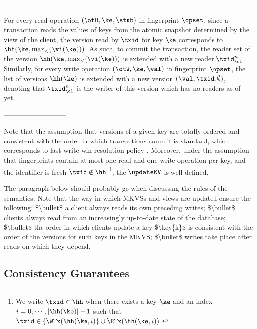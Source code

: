 ----------------------------

For every read operation $(\otR, \ke, \stub)$ in fingerprint $\opset$,
since a transaction reads the values of keys from 
the atomic snapshot determined by the view of the client, 
the version read by $\txid$ for key $\ke$ corresponds to $\hh(\ke, \max_{<}(\vi(\ke)))$.
As such, to commit the transaction, 
the reader set of the version $\hh(\ke, \max_{<}(\vi(\ke)))$ is extended with a new reader $\txid_\cl^n$.
Similarly, for every write operation $(\otW, \ke, \val)$ in fingerprint $\opset$, 
the list of versions $\hh(\ke)$ is extended with a new version $(\val, \txid, \emptyset)$, 
denoting that $\txid_\cl^n$ is the writer of this version which has no readers as of yet. 

---------------------------

Note that the assumption that 
versions of a given key are totally ordered and consistent with the order in which 
transactions commit is standard, 
which corresponds to last-write-win resolution policy \cite{adya,framework-concur,seebelieve}. 
Moreover, under the assumption that fingerprints contain at most one read and one write 
operation per key, and the identifier is fresh $\txid \notin \hh$%
\footnote{%
We write $\txid \in \hh$ when there exists a key 
$\ke$ and an index $i=0,\cdots, \lvert \hh(\ke) \rvert -1$ such that $\txid \in \{\WTx(\hh(\ke, i)\} \cup \RTx(\hh(\ke, i))$.}, 
the $\updateKV$ is well-defined.





\ac{The paragraph below should probably go when discussing the rules of the semantics:

Note that the way in which MKVSs and views are updated ensure the following: 
$\bullet$ a client always reads its own preceding writes; 
$\bullet$ clients always read from an increasingly up-to-date state of the database; 
$\bullet$ the order in which clients update a key $\key{k}$ is consistent with the 
order of the versions for such keys in the MKVS; 
$\bullet$ writes take place after reads on which they depend. 
}




\subsection{Consistency Guarantees}


